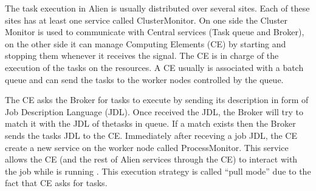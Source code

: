 

The task execution in Alien is usually distributed over several sites. Each of these sites has at least one service called ClusterMonitor. On one side the Cluster Monitor is used to communicate with Central services (Task queue and Broker), on the other side it can manage Computing Elements (CE) by starting and stopping them whenever it receives the signal.
The CE is in charge of the execution of the tasks on the resources. A CE usually is associated with a batch queue and can send the tasks to the worker nodes controlled by the queue.

The CE asks the Broker for tasks to execute by sending its description in form of Job Description Language (JDL).
Once received the JDL, the Broker will try to match it with the JDL of thetasks in queue. If a match exists then the Broker sends the tasks JDL to the CE.
Immediately after receving a job JDL, the CE create a new service on the worker node called ProcessMonitor. This service allows the CE (and the rest of Alien services through the CE) to interact with the job while is running \cite{Saiz2003}. 
This execution strategy is called ``pull mode'' due to the fact that CE asks for tasks.




